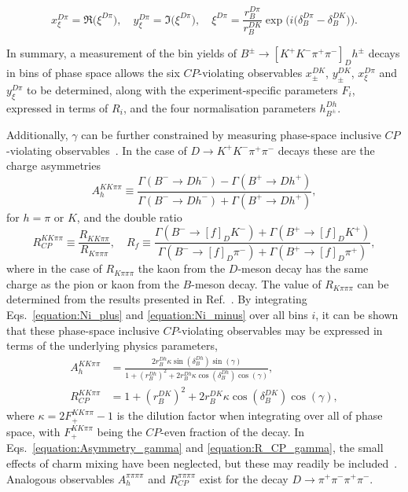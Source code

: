 \documentclass[12pt, a4paper, notitlepage, onecolumn]{article}
\begin{document}
\begin{equation}
    x_\xi^{D\pi} = \Re\big(\xi^{D\pi}\big), \quad y_\xi^{D\pi} = \Im\big(\xi^{D\pi}\big), \quad \xi^{D\pi} = \frac{r_B^{D\pi}}{r_B^{DK}}\exp\Big(i\big(\delta_B^{D\pi} - \delta_B^{DK}\big)\Big).
\end{equation}

In summary, a measurement of the bin yields of $B^\pm\to[K^+K^-\pi^+\pi^-]_D h^\pm$ decays in bins of phase space allows the six $C\!P$-violating observables $x_\pm^{DK}$, $y_\pm^{DK}$, $x_\xi^{D\pi}$ and $y_\xi^{D\pi}$ to be determined, along with the experiment-specific parameters $F_i$, expressed in terms of $R_i$, and the four normalisation parameters $h_{B^\pm}^{D h}$.

Additionally, $\gamma$ can be further constrained by measuring phase-space inclusive $C\!P$-violating observables~\cite{Nayak:2014tea,Malde:2015mha}. In the case of $D \to K^+K^-\pi^+\pi^-$ decays these are the charge asymmetries
\begin{equation}
    A^{KK\pi\pi}_h \equiv \frac{\Gamma(B^-\to D h^-) - \Gamma(B^+\to D h^+)}{\Gamma(B^-\to D h^-) + \Gamma(B^+\to D h^+)},
    \label{equation:Asymmetry}
\end{equation}
for $h = \pi$ or $K$, and the double ratio
\begin{equation}
    R^{KK\pi\pi}_{C\!P} \equiv \frac{R_{KK\pi\pi}}{R_{K\pi\pi\pi}}, \quad R_f \equiv \frac{\Gamma(B^-\to[f]_DK^-) + \Gamma(B^+\to[f]_DK^+)}{\Gamma(B^-\to[f]_D\pi^-) + \Gamma(B^+\to[f]_D\pi^+)},
    \label{equation:R_CP}
\end{equation}
where in the case of $R_{K\pi\pi\pi}$ the kaon from the $D$-meson decay has the same charge as the pion or kaon from the $B$-meson decay. The value of $R_{K\pi\pi\pi}$ can be determined from the results presented in Ref.~\cite{LHCb-PAPER-2022-017}. By integrating Eqs.~\eqref{equation:Ni_plus} and \eqref{equation:Ni_minus} over all bins $i$, it can be shown that these phase-space inclusive $C\!P$-violating observables may be expressed in terms of the underlying physics parameters,
\begin{align}
    A^{KK\pi\pi}_h &= \frac{2r_B^{D h}\kappa\sin(\delta_B^{D h})\sin(\gamma)}{1 + (r_B^{D h})^2 + 2r_B^{D h}\kappa\cos(\delta_B^{D h})\cos(\gamma)}, \label{equation:Asymmetry_gamma} \\[0.5em]
    R^{KK\pi\pi}_{C\!P} &= 1 + (r_B^{DK})^2 + 2r_B^{DK}\kappa\cos(\delta_B^{DK})\cos(\gamma), \label{equation:R_CP_gamma}
\end{align}
where $\kappa = 2F^{KK\pi\pi}_+ - 1$ is the dilution factor when integrating over all of phase space, with $F^{KK\pi\pi}_+$ being the $C\!P$-even fraction of the decay.  In Eqs.~\eqref{equation:Asymmetry_gamma} and \eqref{equation:R_CP_gamma}, the small effects of charm mixing have been neglected, but these may readily be included~\cite{Rama:2013voa}. Analogous observables $A^{\pi\pi\pi\pi}_h$ and $R^{\pi\pi\pi\pi}_{C\!P}$ exist for the decay $D \to \pi^+\pi^-\pi^+\pi^-$.
\end{document}

